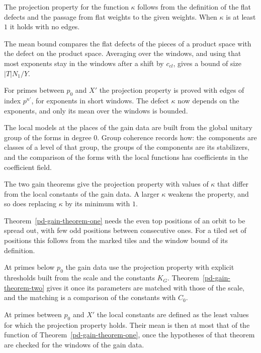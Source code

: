 The projection property for the function $\kappa$ follows from the definition of the flat defects
and the passage from flat weights to the given weights. When $\kappa$ is at least $1$ it holds with
no edges.

The mean bound compares the flat defects of the pieces of a product space with the defect on the
product space. Averaging over the windows, and using that most exponents stay in the windows after a
shift by $c_{cl}$, gives a bound of size $|T|N_1/Y$.

For primes between $p_0$ and $X'$ the projection property is proved with edges of index $p^{n'}$,
for exponents in short windows. The defect $\kappa$ now depends on the exponents, and only its mean
over the windows is bounded.

The local models at the places of the gain data are built from the global unitary group of the
forms in degree $0$. Group coherence records how: the components are classes of a level of that
group, the groups of the components are its stabilizers, and the comparison of the forms with the
local functions has coefficients in the coefficient field.

The two gain theorems give the projection property with values of $\kappa$ that differ from the
local constants of the gain data. A larger $\kappa$ weakens the property, and so does replacing
$\kappa$ by its minimum with $1$.

Theorem~\ref{pd-gain-theorem-one} needs the even top positions of an orbit to be spread out, with
few odd positions between consecutive ones. For a tiled set of positions this follows from the
marked tiles and the window bound of its definition.

At primes below $p_0$ the gain data use the projection property with explicit thresholds built from
the scale and the constants $K_G$. Theorem~\ref{pd-gain-theorem-two} gives it once its parameters are
matched with those of the scale, and the matching is a comparison of the constants with $C_0$.

At primes between $p_0$ and $X'$ the local constants are defined as the least values for which the
projection property holds. Their mean is then at most that of the function of
Theorem~\ref{pd-gain-theorem-one}, once the hypotheses of that theorem are checked for the windows of
the gain data.

